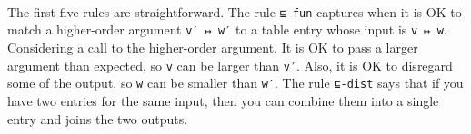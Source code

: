 \begin{fence}
\begin{code}
\\
\>[2][@{}l@{\AgdaIndent{0}}]%
\>[4]\AgdaSpace{}%
\AgdaSpace{}%
\AgdaSpace{}%
\<%
\\
%
\>[4]%
\>[189I]\AgdaSpace{}%
\AgdaSpace{}%
\<%
\\
\>[.][@{}l@{}]\<[189I]%
\>[6]\AgdaComment{-------------------}\<%
\\
%
\>[4]\AgdaSpace{}%
\AgdaSymbol{(}\AgdaSpace{}%
\AgdaSpace{}%
\AgdaSymbol{)}\AgdaSpace{}%
\AgdaSpace{}%
\AgdaSymbol{(}\AgdaSpace{}%
\AgdaSpace{}%
\AgdaSymbol{)}\<%
\\
%
\\[\AgdaEmptyExtraSkip]%
%
\>[2]\AgdaSpace{}%
\AgdaSymbol{:}\AgdaSpace{}%
\AgdaSpace{}%
\AgdaSpace{}%
\AgdaSymbol{\}}\<%
\\
\>[2][@{}l@{\AgdaIndent{0}}]%
\>[6]\AgdaComment{---------------------------------}\<%
\\
\>[2][@{}l@{\AgdaIndent{0}}]%
\>[4]\AgdaSpace{}%
\AgdaSpace{}%
\AgdaSpace{}%
\AgdaSymbol{(}\AgdaSpace{}%
\AgdaSpace{}%
\AgdaSymbol{)}\AgdaSpace{}%
\AgdaSpace{}%
\AgdaSymbol{(}\AgdaSpace{}%
\AgdaSpace{}%
\AgdaSymbol{)}\AgdaSpace{}%
\AgdaSpace{}%
\AgdaSymbol{(}\AgdaSpace{}%
\AgdaSpace{}%
\AgdaSymbol{)}\<%
\end{code}
\end{fence}

The first five rules are straightforward. The rule \texttt{⊑-fun}
captures when it is OK to match a higher-order argument
\texttt{v′\ ↦\ w′} to a table entry whose input is \texttt{v\ ↦\ w}.
Considering a call to the higher-order argument. It is OK to pass a
larger argument than expected, so \texttt{v} can be larger than
\texttt{v′}. Also, it is OK to disregard some of the output, so
\texttt{w} can be smaller than \texttt{w′}. The rule \texttt{⊑-dist}
says that if you have two entries for the same input, then you can
combine them into a single entry and joins the two outputs.

